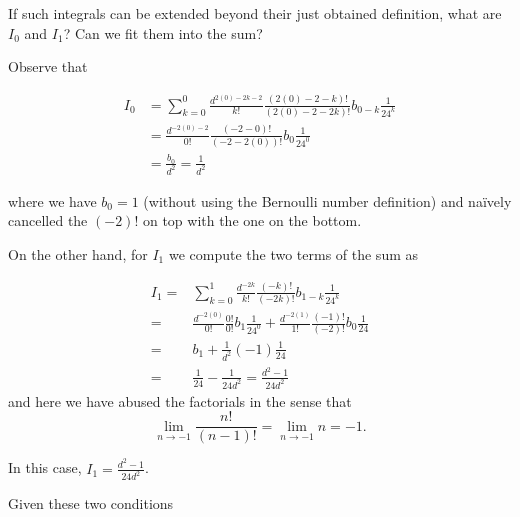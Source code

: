\documentclass[12pt]{memoir}
\begin{document}
\begin{Qn}
    If such integrals can be extended beyond their just obtained definition, what are \(I_0\) and \(I_1\)? Can we fit them into the sum?
\end{Qn}

\begin{ptcb}
    Observe that

    \begin{align*}
        I_0 & =\sum_{k=0}^{0}\frac{d^{2(0)-2k-2}}{k!}\frac{(2(0)-2-k)!}{(2(0)-2-2k)!}b_{0-k}\frac{1}{24^k} \\
            & =\frac{d^{-2(0)-2}}{0!}\frac{(-2-0)!}{(-2-2(0))!}b_{0}\frac{1}{24^0}                         \\
            & =\frac{b_0}{d^2}=\frac{1}{d^2}
    \end{align*}



    where we have \(b_0=1\) (without using the Bernoulli number definition) and naïvely cancelled the \((-2)!\) on top with the one on the bottom.\par
    On the other hand, for \(I_1\) we compute the two terms of the sum as

    \begin{align*}
        I_1= & \sum_{k=0}^{1}\frac{d^{-2k}}{k!}\frac{(-k)!}{(-2k)!}b_{1-k}\frac{1}{24^k}                                  \\
        =    & \frac{d^{-2(0)}}{0!}\frac{0!}{0!}b_1\frac{1}{24^0} +\frac{d^{-2(1)}}{1!}\frac{(-1)!}{(-2)!}b_0\frac{1}{24} \\
        =    & b_1+\frac{1}{d^2}(-1)\frac{1}{24}                                                                          \\
        =    & \frac{1}{24}-\frac{1}{24d^2}=\frac{d^2-1}{24d^2}
    \end{align*}
    and here we have abused the factorials in the sense that
    \[
        \lim_{n\to-1}\frac{n!}{(n-1)!}=\lim_{n\to-1}n=-1.
    \]

    In this case, \(I_1=\frac{d^2-1}{24d^2}\).

\end{ptcb}

Given these two conditions
\end{document}

